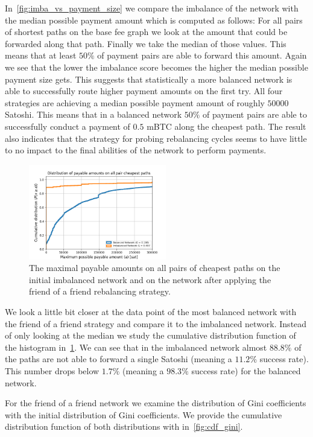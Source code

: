 \documentclass[conference]{IEEEtran}
\begin{document}
In~\cref{fig:imba_vs_payment_size} we compare the imbalance of the network with the median possible payment amount which is computed as follows:
For all pairs of shortest paths on the base fee graph we look at the amount that could be forwarded along that path.
Finally we take the median of those values.
This means that at least $50\%$ of payment pairs are able to forward this amount.
Again we see that the lower the imbalance score becomes the higher the median possible payment size gets.
This suggests that statistically a more balanced network is able to successfully route higher payment amounts on the first try.
All four strategies are achieving a median possible payment amount of roughly $50000$ Satoshi.
This means that in a balanced network $50\%$ of payment pairs are able to successfully conduct a payment of $0.5$ mBTC along the cheapest path. 
The result also indicates that the strategy for probing rebalancing cycles seems to have little to no impact to the final abilities of the network to perform payments.


\begin{figure}
 \centering
 \includegraphics[width=6cm]{code/vs/fig/maximum_payable_amount_all_pair_chepest_paths_balanced_network.png}
 \caption{The maximal payable amounts on all pairs of cheapest paths on the initial imbalanced network and on the network after applying the friend of a friend rebalancing strategy.}
 \label{fig:cdf_paymentsize}
\end{figure}

We look a little bit closer at the data point of the most balanced network with the friend of a friend strategy and compare it to the imbalanced network.
Instead of only looking at the median we study the cumulative distribution function of the histogram in~\cref{fig:cdf_paymentsize}.
We can see that in the imbalanced network almost $88.8\%$ of the paths are not able to forward a single Satoshi (meaning a $11.2\%$ success rate).
This number drops below $1.7\%$ (meaning a $98.3\%$ success rate) for the balanced network.

For the friend of a friend network we examine the distribution of Gini coefficients with the initial distribution of Gini coefficients.
We provide the cumulative distribution function of both distributions with in~\cref{fig:cdf_gini}.
\end{document}
